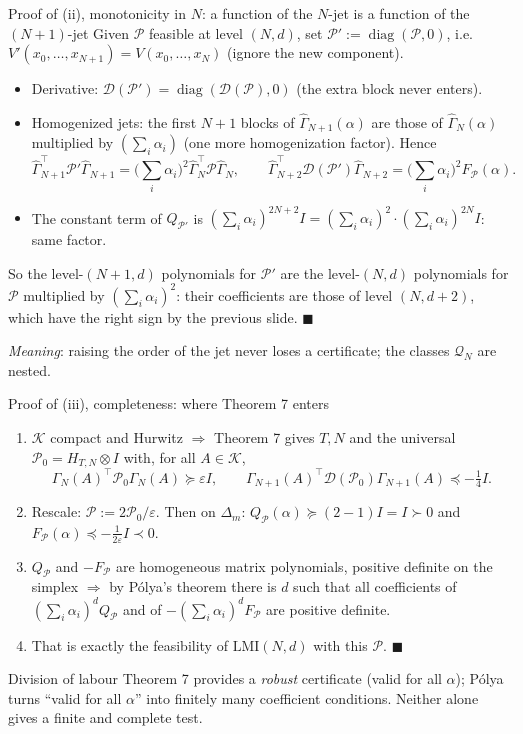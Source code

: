 \documentclass[10pt,aspectratio=169]{beamer}
\newcommand{\tr}{^{\top}}
\newcommand{\PP}{\mathcal{P}}
\newcommand{\DD}{\mathcal{D}}
\newcommand{\KK}{\mathcal{K}}
\DeclareMathOperator{\diag}{diag}
\begin{document}
\begin{frame}{Proof of (ii), monotonicity in $N$: a function of the $N$-jet is a function of the $(N+1)$-jet}
Given $\PP$ feasible at level $(N,d)$, set $\PP':=\diag(\PP,0)$, i.e.\ $V'(x_0,\dots,x_{N+1})=V(x_0,\dots,x_N)$ (ignore the new component).
\begin{itemize}
\item Derivative: $\DD(\PP')=\diag(\DD(\PP),0)$ (the extra block never enters).
\item Homogenized jets: the first $N+1$ blocks of $\hat\Gamma_{N+1}(\alpha)$ are those of $\hat\Gamma_N(\alpha)$ multiplied by $(\sum_i\alpha_i)$ (one more homogenization factor). Hence
\[
\hat\Gamma_{N+1}\tr\PP'\hat\Gamma_{N+1}=\Big(\sum_i\alpha_i\Big)^2\hat\Gamma_N\tr\PP\hat\Gamma_N,\qquad
\hat\Gamma_{N+2}\tr\DD(\PP')\hat\Gamma_{N+2}=\Big(\sum_i\alpha_i\Big)^2F_\PP(\alpha).
\]
\item The constant term of $Q_{\PP'}$ is $(\sum_i\alpha_i)^{2N+2}I=(\sum_i\alpha_i)^2\cdot(\sum_i\alpha_i)^{2N}I$: same factor.
\end{itemize}
\medskip
So the level-$(N+1,d)$ polynomials for $\PP'$ are the level-$(N,d)$ polynomials for $\PP$ multiplied by $(\sum_i\alpha_i)^2$: their coefficients are those of level $(N,d+2)$, which have the right sign by the previous slide. $\blacksquare$
\medskip

\emph{Meaning}: raising the order of the jet never loses a certificate; the classes $\mathcal Q_N$ are nested.
\end{frame}

\begin{frame}{Proof of (iii), completeness: where Theorem 7 enters}
\begin{enumerate}
\item $\KK$ compact and Hurwitz $\Rightarrow$ Theorem 7 gives $T,N$ and the universal $\PP_0=H_{T,N}\otimes I$ with, for all $A\in\KK$,
\[
\Gamma_N(A)\tr\PP_0\Gamma_N(A)\succeq\varepsilon I,\qquad \Gamma_{N+1}(A)\tr\DD(\PP_0)\Gamma_{N+1}(A)\preceq-\tfrac14I .
\]
\item Rescale: $\PP:=2\PP_0/\varepsilon$. Then on $\Delta_m$: $Q_\PP(\alpha)\succeq(2-1)I=I\succ0$ and $F_\PP(\alpha)\preceq-\frac{1}{2\varepsilon}I\prec0$.
\item $Q_\PP$ and $-F_\PP$ are homogeneous matrix polynomials, positive definite on the simplex $\Rightarrow$ by P\'olya's theorem there is $d$ such that all coefficients of $(\sum_i\alpha_i)^dQ_\PP$ and of $-(\sum_i\alpha_i)^dF_\PP$ are positive definite.
\item That is exactly the feasibility of $\mathrm{LMI}(N,d)$ with this $\PP$. $\blacksquare$
\end{enumerate}
\medskip
\begin{block}{Division of labour}
Theorem 7 provides a \emph{robust} certificate (valid for all $\alpha$); P\'olya turns ``valid for all $\alpha$'' into finitely many coefficient conditions. Neither alone gives a finite and complete test.
\end{block}
\end{frame}
\end{document}
